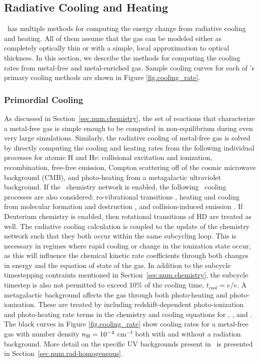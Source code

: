\subsection{Radiative Cooling and Heating}
\label{sec.num.cooling}

\enzo\ has multiple methods for computing the energy change from radiative
cooling and heating.  All of them assume that the gas can be modeled either as
completely optically thin or with a simple, local approximation to optical
thickness.  In this section, we describe the methods for computing the cooling rates from
metal-free and metal-enriched gas.  Sample cooling curves for each of \enzo's
primary cooling methods are shown in Figure \ref{fig.cooling_rate}.

\subsubsection{Primordial Cooling}

As discussed in Section~\ref{sec.num.chemistry}, the set of reactions that
characterize a metal-free gas is simple enough to be computed in
non-equilibrium during even very large simulations.  Similarly, the radiative
cooling of metal-free gas is solved by directly computing the cooling
and heating rates from the following individual processes for atomic H
and He: collisional excitation and ionization, recombination,
free-free emission, Compton scattering off of the cosmic microwave
background (CMB), and photo-heating from a metagalactic ultraviolet background.
If the \HH~chemistry network is enabled, the following \HH~cooling 
processes are also considered: ro-vibrational transitions
\citep{2008MNRAS.388.1627G,1998A&A...335..403G}, heating and cooling from molecular
formation and destruction \citep{2009Sci...325..601T}, and
collision-induced emission \citep{2004MNRAS.348.1019R}.  If Deuterium
chemistry is enabled, then rotational transitions of HD
\citep{1998A&A...335..403G, 1983ApJ...270..578L} are treated as well.  The
radiative cooling calculation is coupled to the update of the chemistry network
such that they both occur within the same subcycling loop.  This is necessary
in regimes where rapid cooling or change in the ionization state occur, as this
will influence the chemical kinetic rate coefficients through both changes in
energy and the equation of state of the gas.  In addition to the subcycle
timestepping contraints mentioned in Section~\ref{sec.num.chemistry}, the
subcycle timestep is also not permitted to exceed 10\% of the cooling time,
$t_{cool} = e/\dot{e}$.  A metagalactic background affects the gas through both
photo-heating and photo-ionization.  These are treated by including
redshift-dependent photo-ionization and photo-heating rate terms in the
chemistry and cooling equations for , , and .
The black curves in Figure \ref{fig.cooling_rate} show cooling rates for a
metal-free gas with number density $n_{\rm H} = 10^{-4}$ cm$^{-3}$ both with
and without a radiation background.  More detail on the specific UV backgrounds
present in \enzo\ is presented in Section~\ref{sec.num.rad-homogeneous}.

